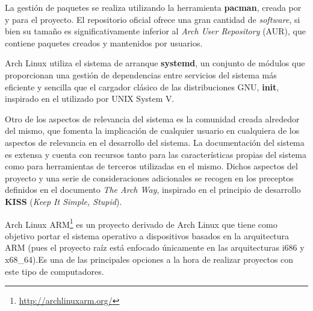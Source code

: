 
La gestión de paquetes se realiza utilizando la herramienta \textbf{pacman}\cite{pacman}, creada por y para el proyecto. El repositorio oficial ofrece una gran cantidad de \textit{software}, si bien su tamaño es significativamente inferior al \textit{Arch User Repository} (AUR), que contiene paquetes creados y mantenidos por usuarios.

Arch Linux utiliza el sistema de arranque \textbf{systemd}\cite{systemd}, un conjunto de módulos que proporcionan una gestión de dependencias entre servicios del sistema más eficiente y sencilla que el cargador clásico de las distribuciones GNU, \textbf{init}\cite{init}, inspirado en el utilizado por UNIX System V.

Otro de los aspectos de relevancia del sistema es la comunidad creada alrededor del mismo, que fomenta la implicación de cualquier usuario en cualquiera de los aspectos de relevancia en el desarrollo del sistema. La documentación del sistema es extensa y cuenta con recursos tanto para las características propias del sistema como para herramientas de terceros utilizadas en el mismo. Dichos aspectos del proyecto y una serie de consideraciones adicionales se recogen en los preceptos definidos en el documento \textit{The Arch Way}\cite{thearchway}, inspirado en el principio de desarrollo \textbf{KISS} (\textit{Keep It Simple, Stupid}).

Arch Linux ARM\footnote{\href{http://archlinuxarm.org/}{http://archlinuxarm.org/}} es un proyecto derivado de Arch Linux que tiene como objetivo portar el sistema operativo a dispositivos basados en la arquitectura ARM (pues el proyecto raíz está enfocado únicamente en las arquitecturas i686 y x68\_64).Es una de las principales opciones a la hora de realizar proyectos con este tipo de computadores\cite{distrowatch:arm}.

